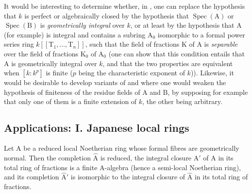 \begin{remark}[7.5.8]
\label{IV.7.5.8}
It would be interesting to determine whether, in , one can replace the hypothesis that $k$ is perfect or algebraically closed by the hypothesis that $\operatorname{Spec}(\mathrm{A})$ or $\operatorname{Spec}(\mathrm{B})$ is \emph{geometrically integral} over $k$, or at least by the hypothesis that $\mathrm{A}$ (for example) is integral and contains a subring $\mathrm{A}_0$ isomorphic to a formal power series ring $k[\![\mathrm{T}_1,\ldots,\mathrm{T}_n]\!]$, such that the field of fractions $\mathrm{K}$ of $\mathrm{A}$ is \emph{separable} over the field of fractions $\mathrm{K}_0$ of $\mathrm{A}_0$ (one can show that this condition entails that $\mathrm{A}$ is geometrically integral over $k$, and that the two properties are equivalent when $[k:k^p]$ is finite ($p$ being the characteristic exponent of $k$)). Likewise, it would be desirable to develop variants of  and  where one would weaken the hypothesis of finiteness of the residue fields of $\mathrm{A}$ and $\mathrm{B}$, by supposing for example that only one of them is a finite extension of $k$, the other being arbitrary.
\end{remark}


\subsection{Applications: I. Japanese local rings}
\label{subsection:IV.7.6}

\begin{proposition}[7.6.1]
\label{IV.7.6.1}
Let $\mathrm{A}$ be a reduced local Noetherian ring whose formal fibres are geometrically normal. Then the completion $\widehat{\mathrm{A}}$ is reduced, the integral closure $\mathrm{A}'$ of $\mathrm{A}$ in its total ring of fractions is a finite $\mathrm{A}$-algebra (hence a semi-local Noetherian ring), and its completion $\widehat{\mathrm{A}}'$ is isomorphic to the integral closure of $\widehat{\mathrm{A}}$ in its total ring of fractions.
\end{proposition}

